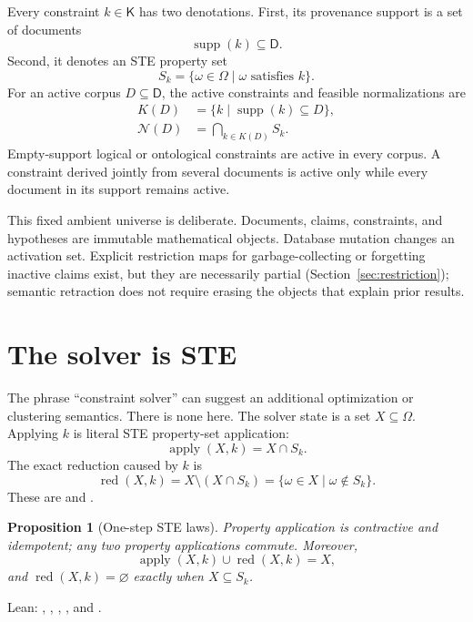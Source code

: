 \documentclass[11pt]{article}
\newtheorem{proposition}[theorem]{Proposition}
\theoremstyle{definition}
\theoremstyle{remark}
\newcommand{\Hyp}{\Omega}
\newcommand{\Feas}{\mathcal N}
\newcommand{\Docs}{\mathsf D}
\newcommand{\Constraints}{\mathsf K}
\begin{document}
Every constraint $k\in\Constraints$ has two denotations.  First, its provenance
support is a set of documents
\[
  \operatorname{supp}(k)\subseteq\Docs.
\]
Second, it denotes an STE property set
\[
  S_k=\{\omega\in\Hyp\mid \omega\text{ satisfies }k\}.
\]
For an active corpus $D\subseteq\Docs$, the active constraints and feasible
normalizations are
\begin{align}
  K(D) &= \{k\mid \operatorname{supp}(k)\subseteq D\},\\
  \Feas(D) &= \bigcap_{k\in K(D)} S_k.
\end{align}
Empty-support logical or ontological constraints are active in every corpus.
A constraint derived jointly from several documents is active only while every
document in its support remains active.

This fixed ambient universe is deliberate.  Documents, claims, constraints,
and hypotheses are immutable mathematical objects.  Database mutation changes
an activation set.  Explicit restriction maps for garbage-collecting or
forgetting inactive claims exist, but they are necessarily partial
(Section~\ref{sec:restriction}); semantic retraction does not require erasing
the objects that explain prior results.

\section{The solver is STE}

The phrase ``constraint solver'' can suggest an additional optimization or
clustering semantics.  There is none here.  The solver state is a set
$X\subseteq\Hyp$.  Applying $k$ is literal STE property-set application:
\begin{equation}
  \operatorname{apply}(X,k)=X\cap S_k.                 \label{eq:apply}
\end{equation}
The exact reduction caused by $k$ is
\begin{equation}
  \operatorname{red}(X,k)=X\setminus(X\cap S_k)
    =\{\omega\in X\mid \omega\notin S_k\}.           \label{eq:reduction}
\end{equation}
These are  and
.

\begin{proposition}[One-step STE laws]
Property application is contractive and idempotent; any two property
applications commute.  Moreover,
\[
  \operatorname{apply}(X,k)\cup\operatorname{red}(X,k)=X,
\]
and $\operatorname{red}(X,k)=\varnothing$ exactly when $X\subseteq S_k$.
\end{proposition}
\noindent Lean:
,
,
,
, and
.
\end{document}
